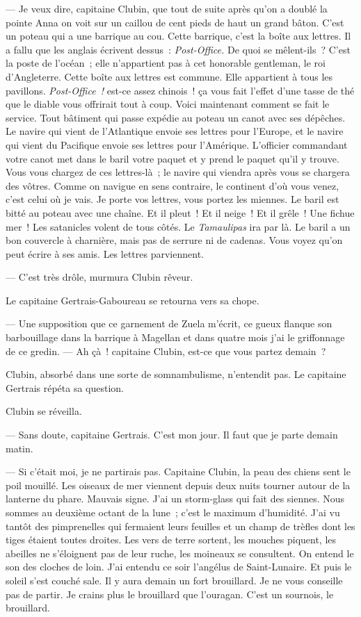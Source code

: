 \documentclass[french,twoside]{book} %
\begin{document}
— Je veux dire, capitaine Clubin, que tout de suite après qu’on a doublé la pointe Anna on voit sur un caillou de cent pieds de haut un grand bâton. C’est un poteau qui a une barrique au cou. Cette barrique, c’est la boîte aux lettres. Il a fallu que les anglais écrivent dessus : \emph{Post-Office.} De quoi se mêlent-ils ? C’est la poste de l’océan ; elle n’appartient pas à cet honorable gentleman, le roi d’Angleterre. Cette boîte aux lettres est commune. Elle appartient à tous les pavillons. \emph{Post-Office !} est-ce assez chinois ! ça vous fait l’effet d’une tasse de thé que le diable vous offrirait tout à coup. Voici maintenant comment se fait le service. Tout bâtiment qui passe expédie au poteau un canot avec ses dépêches. Le navire qui vient de l’Atlantique envoie ses lettres pour l’Europe, et le navire qui vient du Pacifique envoie ses lettres pour l’Amérique. L’officier commandant votre canot met dans le baril votre paquet et y prend le paquet qu’il y trouve. Vous vous chargez de ces lettres-là ; le navire qui viendra après vous se chargera des vôtres. Comme on navigue en sens contraire, le continent d’où vous venez, c’est celui où je vais. Je porte vos lettres, vous portez les miennes. Le baril est bitté au poteau avec une chaîne. Et il pleut ! Et il neige !  Et il grêle ! Une fichue mer ! Les satanicles volent de tous côtés. Le \emph{Tamaulipas} ira par là. Le baril a un bon couvercle à charnière, mais pas de serrure ni de cadenas. Vous voyez qu’on peut écrire à ses amis. Les lettres parviennent.\par
— C’est très drôle, murmura Clubin rêveur.\par
Le capitaine Gertrais-Gaboureau se retourna vers sa chope.\par
— Une supposition que ce garnement de Zuela m’écrit, ce gueux flanque son barbouillage dans la barrique à Magellan et dans quatre mois j’ai le griffonnage de ce gredin. — Ah çà ! capitaine Clubin, est-ce que vous partez demain ?\par
Clubin, absorbé dans une sorte de somnambulisme, n’entendit pas. Le capitaine Gertrais répéta sa question.\par
Clubin se réveilla.\par
— Sans doute, capitaine Gertrais. C’est mon jour. Il faut que je parte demain matin.\par
— Si c’était moi, je ne partirais pas. Capitaine Clubin, la peau des chiens sent le poil mouillé. Les oiseaux de mer viennent depuis deux nuits tourner autour de la lanterne du phare. Mauvais signe. J’ai un storm-glass qui fait des siennes. Nous sommes au deuxième octant de la lune ; c’est le maximum d’humidité. J’ai vu tantôt des pimprenelles qui fermaient leurs feuilles et un champ de trèfles dont les tiges étaient toutes droites. Les vers de terre sortent, les mouches piquent, les abeilles ne s’éloignent pas de leur ruche, les moineaux se consultent. On entend le son des cloches de loin.  J’ai entendu ce soir l’angélus de Saint-Lunaire. Et puis le soleil s’est couché sale. Il y aura demain un fort brouillard. Je ne vous conseille pas de partir. Je crains plus le brouillard que l’ouragan. C’est un sournois, le brouillard.
\end{document}
